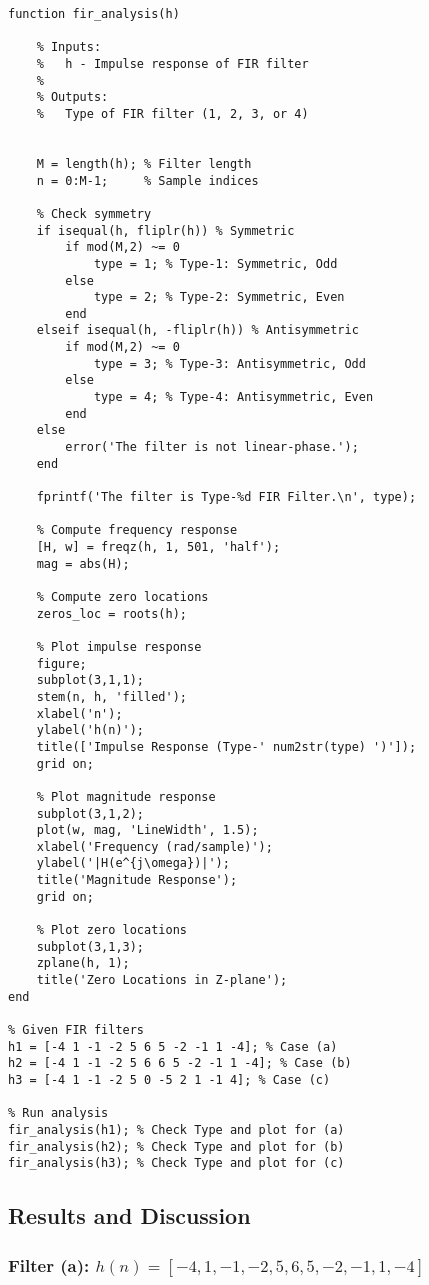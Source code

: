 \documentclass[a4paper,12pt]{article}
\begin{document}
\begin{verbatim}
function fir_analysis(h)

    % Inputs:
    %   h - Impulse response of FIR filter
    %
    % Outputs:
    %   Type of FIR filter (1, 2, 3, or 4)


    M = length(h); % Filter length
    n = 0:M-1;     % Sample indices

    % Check symmetry
    if isequal(h, fliplr(h)) % Symmetric
        if mod(M,2) ~= 0
            type = 1; % Type-1: Symmetric, Odd
        else
            type = 2; % Type-2: Symmetric, Even
        end
    elseif isequal(h, -fliplr(h)) % Antisymmetric
        if mod(M,2) ~= 0
            type = 3; % Type-3: Antisymmetric, Odd
        else
            type = 4; % Type-4: Antisymmetric, Even
        end
    else
        error('The filter is not linear-phase.');
    end

    fprintf('The filter is Type-%d FIR Filter.\n', type);

    % Compute frequency response
    [H, w] = freqz(h, 1, 501, 'half');
    mag = abs(H);

    % Compute zero locations
    zeros_loc = roots(h);

    % Plot impulse response
    figure;
    subplot(3,1,1);
    stem(n, h, 'filled');
    xlabel('n');
    ylabel('h(n)');
    title(['Impulse Response (Type-' num2str(type) ')']);
    grid on;

    % Plot magnitude response
    subplot(3,1,2);
    plot(w, mag, 'LineWidth', 1.5);
    xlabel('Frequency (rad/sample)');
    ylabel('|H(e^{j\omega})|');
    title('Magnitude Response');
    grid on;

    % Plot zero locations
    subplot(3,1,3);
    zplane(h, 1);
    title('Zero Locations in Z-plane');
end

% Given FIR filters
h1 = [-4 1 -1 -2 5 6 5 -2 -1 1 -4]; % Case (a)
h2 = [-4 1 -1 -2 5 6 6 5 -2 -1 1 -4]; % Case (b)
h3 = [-4 1 -1 -2 5 0 -5 2 1 -1 4]; % Case (c)

% Run analysis
fir_analysis(h1); % Check Type and plot for (a)
fir_analysis(h2); % Check Type and plot for (b)
fir_analysis(h3); % Check Type and plot for (c)
\end{verbatim}

\subsection{Results and Discussion}

\subsubsection{Filter (a): \( h(n) = [-4, 1, -1, -2, 5, 6, 5, -2, -1, 1, -4] \)}
\end{document}
